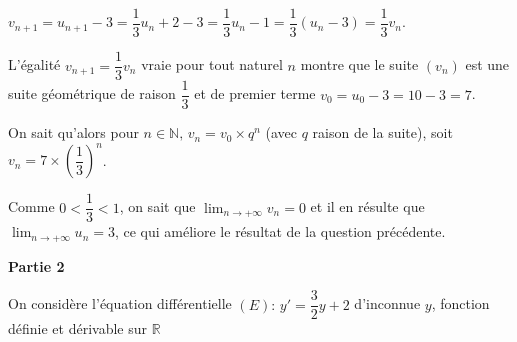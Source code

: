 \documentclass[10pt]{article}
\providecommand{\R}{\mathbb{R}}
\providecommand{\N}{\mathbb{N}}
\begin{document}
\begin{enumerate}
$v_{n+1} = u_{n+1} - 3 = \dfrac13u_n + 2 - 3 = \dfrac13u_n - 1 = \dfrac13(u_n - 3) = \dfrac13v_n$.

L'égalité $v_{n+1} = \dfrac13v_n$ vraie pour tout naturel $n$ montre que le suite $(v_n)$ est une suite géométrique de raison $\dfrac13$ et de premier terme $v_0 = u_0 - 3 = 10 - 3 = 7$.

On sait qu'alors pour $n \in \N, \, v_n = v_0 \times q^n$ (avec $q$ raison de la suite), soit $v_n = 7\times \left(\dfrac13\right)^n$.

Comme $0 < \dfrac13 < 1$, on sait que $\displaystyle\lim_{n \to + \infty} v_n = 0$ et il en résulte que $\displaystyle\lim_{n \to + \infty} u_n = 3$, ce qui améliore le résultat de la question précédente.
\end{enumerate}

\medskip

\textbf{Partie 2}

\medskip

On considère l'équation différentielle $(E) :\, y' = \dfrac32 y + 2$ d'inconnue $y$, fonction définie et 
dérivable sur $\R$

\medskip
\end{document}
